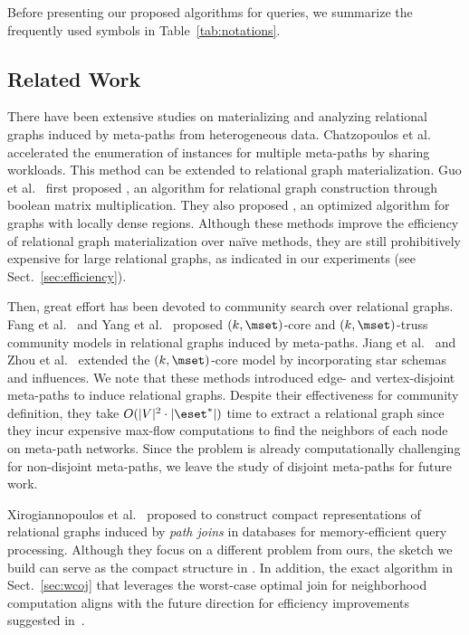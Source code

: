 Before presenting our proposed algorithms for \ced queries, we summarize the frequently used symbols in Table~\ref{tab:notations}.



\subsection{Related Work}
\label{sec:related}

There have been extensive studies on materializing and analyzing relational graphs induced by meta-paths from heterogeneous data.
Chatzopoulos et al.~\cite{chatzopoulos2023atrapos} accelerated the enumeration of instances for multiple meta-paths by sharing workloads.
This method can be extended to relational graph materialization.
Guo et al.~\cite{guo2024efficient} first proposed \boolap, an algorithm for relational graph construction through boolean matrix multiplication.
They also proposed \boolapp, an optimized algorithm for graphs with locally dense regions.
Although these methods improve the efficiency of relational graph materialization over na\"ive methods, they are still prohibitively expensive for large relational graphs, as indicated in our experiments (see Sect.~\ref{sec:efficiency}).

Then, great effort \cite{fang2020effective, yang2020effective, jiang2022effective, ZhouFLY23} has been devoted to community search over relational graphs.
Fang et al.~\cite{fang2020effective} and Yang et al.~\cite{yang2020effective} proposed $(k, \mset)$-core and $(k, \mset)$-truss community models in relational graphs induced by meta-paths.
Jiang et al.~\cite{jiang2022effective} and Zhou et al.~\cite{ZhouFLY23} extended the $(k, \mset)$-core model by incorporating star schemas and influences.
We note that these methods introduced edge- and vertex-disjoint meta-paths to induce relational graphs.
Despite their effectiveness for community definition, they take $O(|V|^2 \cdot |\eset^*|)$ time to extract a relational graph since they incur expensive max-flow computations to find the neighbors of each node on meta-path networks.
Since the \ced problem is already computationally challenging for non-disjoint meta-paths, we leave the study of disjoint meta-paths for future work.

Xirogiannopoulos et al.~\cite{xirogiannopoulos2017extracting} proposed to construct compact representations of relational graphs induced by \emph{path joins} in databases for memory-efficient query processing. Although they focus on a different problem from ours, the sketch we build can serve as the compact structure in \cite{xirogiannopoulos2017extracting}. In addition, the exact algorithm in Sect.~\ref{sec:wcoj} that leverages the worst-case optimal join for neighborhood computation aligns with the future direction for efficiency improvements suggested in~\cite{xirogiannopoulos2017extracting}.


